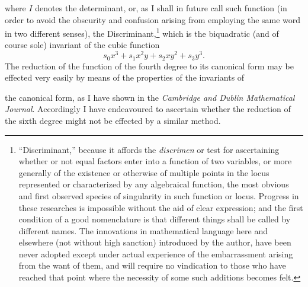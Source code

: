 \documentclass[11pt]{article}
\newcommand{\sourcepage}[1]{\marginpar{\scriptsize p.~#1}}
\begin{document}
{{where $I$ denotes the determinant, or, as I shall in future call such function (in order to avoid the obscurity and confusion arising from employing the same word in two different senses), the Discriminant,\footnote{``Discriminant,'' because it affords the \emph{discrimen} or test for ascertaining whether or not equal factors enter into a function of two variables, or more generally of the existence or otherwise of multiple points in the locus represented or characterized by any algebraical function, the most obvious and first observed species of singularity in such function or locus. Progress in these researches is impossible without the aid of clear expression; and the first condition of a good nomenclature is that different things shall be called by different names. The innovations in mathematical language here and elsewhere (not without high sanction) introduced by the author, have been never adopted except under actual experience of the embarrassment arising from the want of them, and will require no vindication to those who have reached that point where the necessity of some such additions becomes felt.} which is the biquadratic (and of course sole) invariant of the cubic function
\[
s_0x^3+s_1x^2y+s_2xy^2+s_3y^3.
\]
The reduction of the function of the fourth degree to its canonical form may be effected very easily by means of the properties of the invariants of

\sourcepage{281}
the canonical form, as I have shown in the \emph{Cambridge and Dublin Mathematical Journal}. Accordingly I have endeavoured to ascertain whether the reduction of the sixth degree might not be effected by a similar method.

}}
\end{document}
